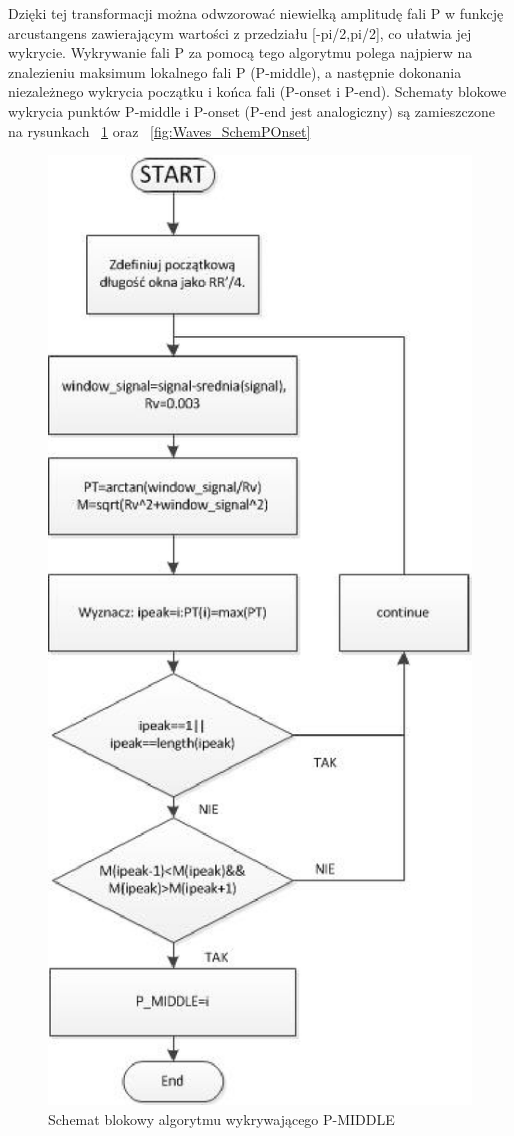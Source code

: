 Dzięki tej transformacji można odwzorować niewielką amplitudę fali P w funkcję arcustangens zawierającym wartości z przedziału [-pi/2,pi/2], co ułatwia jej wykrycie. Wykrywanie fali P za pomocą tego algorytmu polega najpierw na znalezieniu maksimum lokalnego fali P (P-middle), a następnie dokonania niezależnego wykrycia początku i końca fali (P-onset i P-end). Schematy blokowe wykrycia punktów P-middle i P-onset (P-end jest analogiczny) są zamieszczone na rysunkach ~\ref{fig:Waves_SchemPMid} oraz ~\ref{fig:Waves_SchemPOnset}

\begin{figure}[H]
\centering
\includegraphics[scale=0.8] {Waves/img/schemat_Pmiddle.eps}
\caption{Schemat blokowy algorytmu wykrywającego P-MIDDLE  }
\label{fig:Waves_SchemPMid}
\end{figure}

